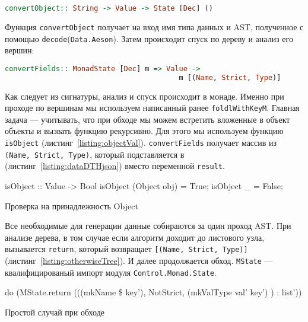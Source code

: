 \begin{lstlisting}[language=Haskell]
convertObject:: String -> Value -> State [Dec] ()
\end{lstlisting}

Функция \lstinline{convertObject} получает на вход имя типа данных и AST, полученное с помощью \lstinline{decode}(\lstinline{Data.Aeson}). Затем происходит спуск по дереву и анализ его вершин:

\begin{lstlisting}[language=Haskell]
convertFields:: MonadState [Dec] m => Value -> 
                                         m [(Name, Strict, Type)]
\end{lstlisting}

Как следует из сигнатуры, анализ и спуск происходит в монаде. Именно при проходе по вершинам мы используем написанный ранее \lstinline{foldlWithKeyM}. Главная задача --- учитывать, что при обходе мы можем встретить вложенные в объект объекты и вызвать функцию рекурсивно. Для этого мы используем функцию \lstinline{isObject} (листинг~\ref{listing:objectVal}). \lstinline{convertFields} получает массив из \lstinline{(Name, Strict, Type)}, который подставляется в (листинг~\ref{listing:dataDTHjson}) вместо переменной \lstinline{result}.

\begin{ListingEnv}[H]
\begin{Verb}
isObject :: Value -> Bool
isObject (Object obj) = True;
isObject _ = False;
\end{Verb}
\caption{Проверка на принадлежность Object}
\label{listing:objectVal}
\end{ListingEnv} 

Все необходимые для генерации данные собираются за один проход AST. При анализе дерева, в том случае если алгоритм доходит до листового узла, вызывается \lstinline{return}, который возвращает \lstinline{[(Name, Strict, Type)]} (листинг~\ref{listing:otherwiseTree}). И далее продолжается обход. \lstinline{MState} --- квалифицированый импорт модуля \lstinline{Control.Monad.State}.

\begin{ListingEnv}[H]
\begin{Verb}
do
      (MState.return (((mkName \$  key'), NotStrict,
                                (mkValType val' key') ) : list'))
\end{Verb}
\caption{Простой случай при обходе}
\label{listing:otherwiseTree}
\end{ListingEnv} 

